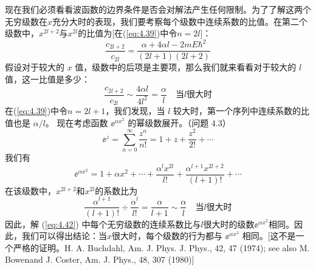     现在我们必须看看波函数的边界条件是否会对解法产生任何限制。为了了解这两个无穷级数在$x$充分大时的表现，我们要考察每个级数中连续系数的比值。在第二个级数中，$x^{2l+2}$与$x^{2l}$的比值为[在(\ref{eq:4.39})中令$n=2l$]：
    \begin{equation*}
        \frac{c_{2l+2}}{c_{2l}} = \frac{\alpha + 4\alpha l - 2mE\hbar^2}{(2l+1)(2l+2)}
    \end{equation*}
    假设对于较大的 $x$ 值，级数中的后项是主要项，那么我们就来看看对于较大的 $l$ 值，这一比值是多少：
    \begin{equation}
        \frac{c_{2l+2}}{c_{2l}} \sim \frac{4\alpha l}{4l^2} = \frac{\alpha}{l} \quad \text{当}l\text{很大时}
        \label{eq:4.43}
    \end{equation}
    在(\ref{eq:4.39})中令$n=2l+1$，我们发现，当 $l$ 较大时，第一个序列中连续系数的比值也是 $\alpha/l$。 现在考虑函数 $\ee ^{\alpha x^2}$ 的幂级数展开。（问题 4.3）
    \begin{equation}
        \ee ^{z} = \sum_{n=0}^{\infty}\frac{z^n}{n!} = 1 + z + \frac{z^2}{2!} + \cdots
        \label{eq:4.44}
    \end{equation}
    我们有
    \begin{equation*}
        \ee ^{\alpha x^2} = 1 + \alpha x^2 + \cdots + \frac{\alpha ^l x^{2l}}{l!} + \frac{\alpha ^{l+1} x^{2l+2}}{(l+1)!} + \cdots
    \end{equation*}
    在该级数中，$x^{2l+2}$和$x^{2l}$的系数比为
    \begin{equation*}
        \frac{\alpha^{l+1}}{\left(l+1\right)!} \div \frac{\alpha^l}{l!} = \frac{\alpha}{l+1} \sim \frac{\alpha}{l} \quad \text{当}l\text{很大时}
    \end{equation*}
    因此，解 (\ref{eq:4.42}) 中每个无穷级数的连续系数比与$l$很大时的级数$\ee ^{\alpha x^2}$相同。因此，我们可以得出结论：当$x$很大时，每个级数的行为都与 $\ee ^{\alpha x^2}$ 相同。[这不是一个严格的证明。H. A. Buchdahl, Am. J. Phys. J. Phys., 42, 47 (1974); see also M. Bowenand J. Coster, Am. J. Phys., 48, 307 (1980)]

